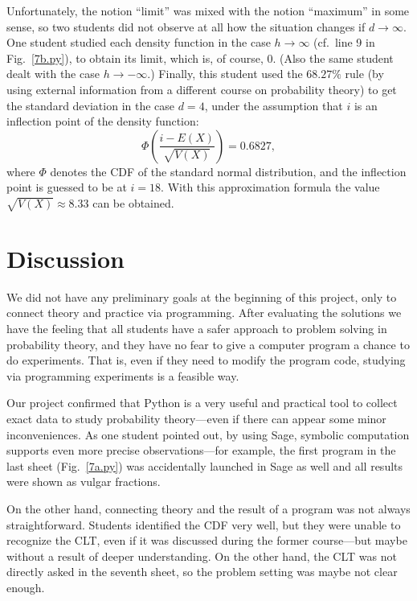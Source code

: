 \documentclass[]{interact}
\theoremstyle{plain}%
\theoremstyle{definition}
\theoremstyle{remark}
\begin{document}
Unfortunately, the notion ``limit'' was mixed with the notion ``maximum'' in some sense, so two students did not
observe at all how the situation changes if $d\to\infty$. One student studied each density function
in the case $h\to\infty$ (cf.~line 9 in Fig.~\ref{7b.py}), to obtain its limit, which is, of course, $0$.
(Also the same student dealt with the case $h\to-\infty$.) Finally, this student used 
the $68.27\%$ rule (by using external information from a different course on
probability theory) to get the standard deviation in the case $d=4$,
under the assumption that $i$ is an inflection point of the density function:
\begin{equation}
\Phi\left(\frac{i-E(X)}{\sqrt{V(X)}}\right)=0.6827,
\end{equation}
where $\Phi$ denotes the CDF of the standard normal distribution, and the inflection point is guessed
to be at $i=18$. With this approximation formula the value $\sqrt{V(X)}\approx8.33$ can be obtained.

\section{Discussion}

We did not have any preliminary goals at the beginning of this project, only to connect theory and
practice via programming. After evaluating the solutions we have the feeling that all students
have a safer approach to problem solving in probability theory, and they have no fear to give
a computer program a chance to do experiments. That is, even if they need to modify the program code,
studying via programming experiments is a feasible way.

Our project confirmed that Python is a very useful and practical tool to collect exact data
to study probability theory---even if there can appear some minor inconveniences.
As one student pointed out, by using Sage, symbolic computation
supports even more precise observations---for example, the first program in the last sheet
(Fig.~\ref{7a.py}) was accidentally launched in Sage as well and all results were shown
as vulgar fractions.

On the other hand, connecting theory and the result of a program was not always straightforward.
Students identified the CDF very well, but they were unable to recognize the CLT, even if
it was discussed during the former course---but maybe without a result of deeper understanding.
On the other hand, the CLT was not directly asked in the seventh sheet,
so the problem setting was maybe not clear enough.
\end{document}
